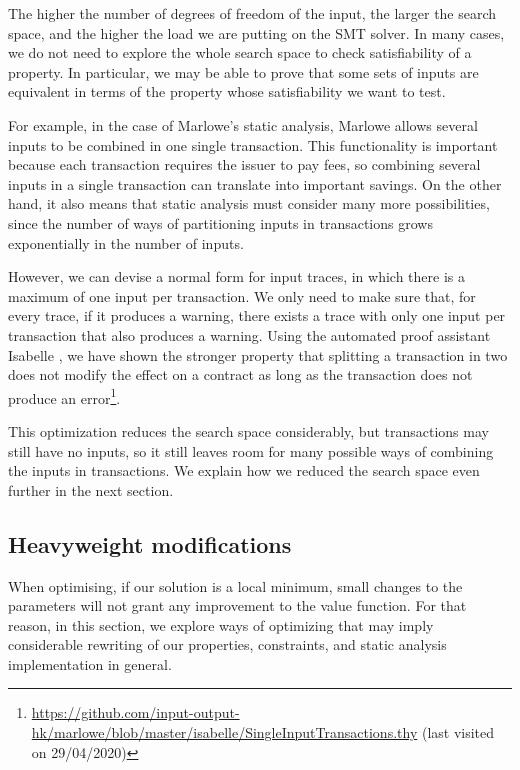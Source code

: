 \documentclass[english,runningheads]{llncs}
\begin{document}
The higher the number of degrees of freedom of the input, the larger
the search space, and the higher the load we are putting on the SMT
solver. In many cases, we do not need to explore the whole search
space to check satisfiability of a property. In particular, we may
be able to prove that some sets of inputs are equivalent in terms
of the property whose satisfiability we want to test.

For example, in the case of Marlowe's static analysis,
Marlowe allows several inputs to be combined in one single transaction.
This functionality is important because each transaction requires
the issuer to pay fees, so combining several inputs in a single transaction
can translate into important savings. On the other hand, it also means
that static analysis must consider many more possibilities, since
the number of ways of partitioning inputs in transactions grows exponentially
in the number of inputs.

However, we can devise a normal form for input traces, in which there
is a maximum of one input per transaction. We only need to make sure
that, for every trace, if it produces a warning, there exists a trace
with only one input per transaction that also produces a warning.
Using the automated proof assistant Isabelle \cite{nipkow2002isabelle},
we have shown the stronger property that splitting a transaction in
two does not modify the effect on a contract as long as the transaction
does not produce an error\footnote{\url{https://github.com/input-output-hk/marlowe/blob/master/isabelle/SingleInputTransactions.thy}
(last visited on 29/04/2020)}.

This optimization reduces the search space considerably, but transactions
may still have no inputs, so it still leaves room for many possible
ways of combining the inputs in transactions. We explain how we reduced
the search space even further in the next section. 

\subsection{Heavyweight modifications \label{subsec:Heavyweight-modifications}}

When optimising, if our solution is a local minimum, small changes
to the parameters will not grant any improvement to the value function.
For that reason, in this section, we explore ways of optimizing that
may imply considerable rewriting of our properties, constraints, and
static analysis implementation in general.
\end{document}
